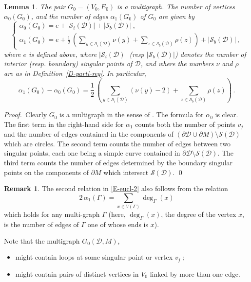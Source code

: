 \documentclass[12pt,a4paper]{amsart}
\theoremstyle{plain} %
\newtheorem{lemma}[theorem]{Lemma}
\theoremstyle{definition}
\newtheorem{remark}[theorem]{Remark}
\numberwithin{equation}{section}
\numberwithin{figure}{section}
\numberwithin{table}{section}
\newcommand{\cD}{\mathcal{D}}
\newcommand{\cS}{\mathcal{S}}
\newcommand{\pf}{\emph{Proof.~}}
\newcommand{\sm}{\!\setminus\!}
\begin{document}
\begin{lemma}\label{L-eucl-2}
The pair $G_0 = (V_0,E_0)$ is a multigraph. The number of vertices $\alpha_0(G_0)$, and the number of edges $\alpha_1(G_0)$ of $G_0$ are given by
%
\begin{equation}\label{E-eucl-2}
\left\{
\begin{array}{l}
\alpha_0(G_0) = e + |\cS_i(\cD)| + |\cS_b(\cD)|\,,\\[5pt]
\alpha_1(G_0) = e + \frac{1}{2} \, \left( \sum_{y \in \cS_i(\cD)} \nu(y)  + \sum_{z\in \cS_b(\cD)} \rho(z)  \right) + |\cS_b(\cD)|\,,
\end{array}
\right.
\end{equation}
where $e$ is defined above, where $|\cS_i(\cD)|$ (resp $|\cS_b(\cD)|$) denotes the number of interior (resp. boundary) singular points of $\cD$, and where the numbers $\nu$ and $\rho$ are as in Definition~\ref{D-parti-reg}. In particular,
%
\begin{equation}\label{E-eucl-4}
\alpha_1(G_0) - \alpha_0(G_0) = \frac{1}{2} \, \left( \sum_{y \in \cS_i(\cD)} (\nu(y)-2)  + \sum_{z\in \cS_b(\cD)} \rho(z)  \right) \,.
\end{equation}
\end{lemma}%

\pf  Clearly $G_0$ is a multigraph in the sense of  \cite[Section~1.10]{Dies2017}. The formula for $\alpha_0$ is clear. The first term in the right-hand side for $\alpha_1$ counts both the number of points $v_j$ and the number of edges contained in the components of $\left( \partial \cD \cup \partial M \right) \sm \cS(\cD)$ which are circles. The second term counts the number of edges between two singular points, each one being a simple curve contained in $\partial \cD \sm \cS(\cD)$. The third term counts the number of edges determined by the boundary singular points on the components of $\partial M$ which intersect $\cS(\cD)$. \hfill \qed \medskip


\begin{remark}\label{R-eucl-2L}
The second relation in \eqref{E-eucl-2} also follows from the relation
%
\begin{equation}\label{E-eucl-2R}
2 \, \alpha_1(\Gamma) = \sum_{x \in V(\Gamma)} \deg_{\Gamma}(x)
\end{equation}
%
which holds for any multi-graph $\Gamma$ (here, $\deg_{\Gamma}(x)$, the degree of the vertex $x$, is the number of edges of $\Gamma$ one of whose ends is $x$).
\end{remark}%

Note that the multigraph $G_0(\cD,M)$,
\begin{itemize}
\item[(a)] might contain loops at some singular point or vertex $v_j$ ;
\item[(b)] might contain pairs of distinct vertices in $V_0$ linked by more than one edge.
\end{itemize}
\end{document}
